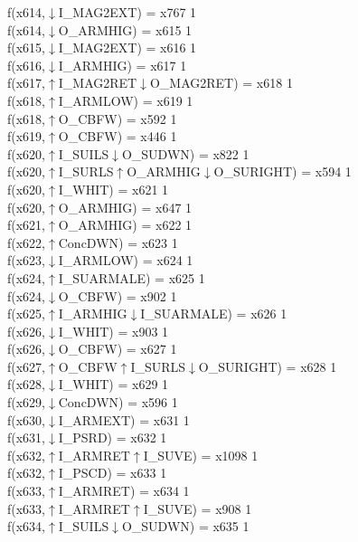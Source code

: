 f(x614,$\downarrow$I\_MAG2EXT) = x767 {1} \\
f(x614,$\downarrow$O\_ARMHIG) = x615 {1} \\
f(x615,$\downarrow$I\_MAG2EXT) = x616 {1} \\
f(x616,$\downarrow$I\_ARMHIG) = x617 {1} \\
f(x617,$\uparrow$I\_MAG2RET$\downarrow$O\_MAG2RET) = x618 {1} \\
f(x618,$\uparrow$I\_ARMLOW) = x619 {1} \\
f(x618,$\uparrow$O\_CBFW) = x592 {1} \\
f(x619,$\uparrow$O\_CBFW) = x446 {1} \\
f(x620,$\uparrow$I\_SUILS$\downarrow$O\_SUDWN) = x822 {1} \\
f(x620,$\uparrow$I\_SURLS$\uparrow$O\_ARMHIG$\downarrow$O\_SURIGHT) = x594 {1} \\
f(x620,$\uparrow$I\_WHIT) = x621 {1} \\
f(x620,$\uparrow$O\_ARMHIG) = x647 {1} \\
f(x621,$\uparrow$O\_ARMHIG) = x622 {1} \\
f(x622,$\uparrow$ConcDWN) = x623 {1} \\
f(x623,$\downarrow$I\_ARMLOW) = x624 {1} \\
f(x624,$\uparrow$I\_SUARMALE) = x625 {1} \\
f(x624,$\downarrow$O\_CBFW) = x902 {1} \\
f(x625,$\uparrow$I\_ARMHIG$\downarrow$I\_SUARMALE) = x626 {1} \\
f(x626,$\downarrow$I\_WHIT) = x903 {1} \\
f(x626,$\downarrow$O\_CBFW) = x627 {1} \\
f(x627,$\uparrow$O\_CBFW$\uparrow$I\_SURLS$\downarrow$O\_SURIGHT) = x628 {1} \\
f(x628,$\downarrow$I\_WHIT) = x629 {1} \\
f(x629,$\downarrow$ConcDWN) = x596 {1} \\
f(x630,$\downarrow$I\_ARMEXT) = x631 {1} \\
f(x631,$\downarrow$I\_PSRD) = x632 {1} \\
f(x632,$\uparrow$I\_ARMRET$\uparrow$I\_SUVE) = x1098 {1} \\
f(x632,$\uparrow$I\_PSCD) = x633 {1} \\
f(x633,$\uparrow$I\_ARMRET) = x634 {1} \\
f(x633,$\uparrow$I\_ARMRET$\uparrow$I\_SUVE) = x908 {1} \\
f(x634,$\uparrow$I\_SUILS$\downarrow$O\_SUDWN) = x635 {1} \\
